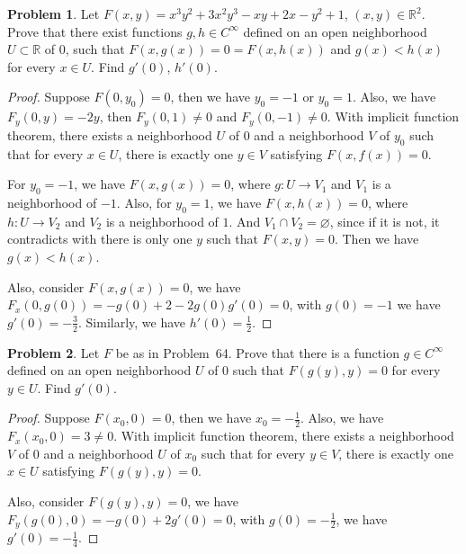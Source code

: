 \documentclass[11pt]{article}
\theoremstyle{definition}
\newtheorem{problem}{Problem}
\theoremstyle{definition}
\begin{document}
\medskip

\begin{problem}
Let $F(x,y)=x^3y^2+3x^2y^3-xy+2x-y^2+1$, $(x,y)\in\mathbb{R}^2$. Prove that there exist functions $g,h\in C^\infty$ defined on an open neighborhood
$U\subset\mathbb{R}$ of $0$, such that $F(x,g(x))=0=F(x,h(x))$ and $g(x)<h(x)$ for every $x\in U$. Find $g'(0)$, $h'(0)$.
\end{problem}
\begin{proof}
Suppose $F(0,y_0) = 0$, then we have $y_0 = -1$ or $y_0 = 1$. Also, we have $F_y(0,y) = -2y$, then $F_y(0,1) \neq 0$ and $F_y(0,-1) \neq 0$. With implicit function theorem, there exists a neighborhood $U$ of $0$ and a neighborhood $V$ of $y_0$ such that for every $x\in U$, there is exactly one $y\in V$ satisfying $F(x, f(x)) = 0$. 

For $y_0 = -1$, we have $F(x, g(x)) = 0$, where $g:U \to V_1$ and $V_1$ is a neighborhood of $-1$. Also, for $y_0 = 1$, we have $F(x, h(x)) = 0$, where $h:U \to V_2$ and $V_2$ is a neighborhood of $1$. And $V_1 \cap V_2 = \varnothing$, since if it is not, it contradicts with there is only one $y$ such that $F(x,y) = 0$. Then we have $g(x) < h(x)$. 

Also, consider $F(x, g(x)) = 0$, we have $F_x(0,g(0)) = - g(0) + 2 - 2g(0) g'(0) = 0$, with $g(0) = -1$ we have $g'(0) = -\frac{3}{2}$. Similarly, we have $h'(0) = \frac{1}{2}$.
\end{proof}

\medskip

\begin{problem}
Let $F$ be as in Problem~64. Prove that there is a function $g\in C^\infty$
defined on an open neighborhood $U$ of $0$ such that $F(g(y),y)=0$
for every $y\in U$. Find $g'(0)$.
\end{problem}
\begin{proof}
Suppose $F(x_0, 0) = 0$, then we have $x_0 = -\frac{1}{2}$. Also, we have $F_x(x_0, 0) = 3 \neq 0$. With implicit function theorem, there exists a neighborhood $V$ of $0$ and a neighborhood $U$ of $x_0$ such that for every $y\in V$, there is exactly one $x\in U$ satisfying $F(g(y), y) = 0$.

Also, consider $F(g(y), y) = 0$, we have $F_y(g(0), 0) = - g(0) + 2 g'(0) = 0$, with $g(0) = -\frac{1}{2}$, we have $g'(0) = -\frac{1}{4}$.
\end{proof}

\medskip
\end{document}
